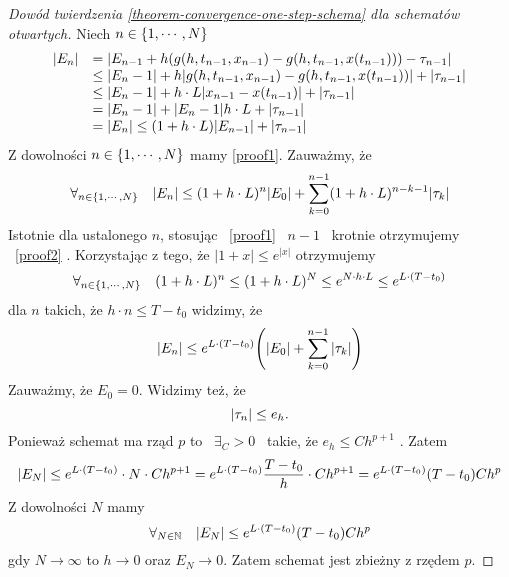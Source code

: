 \documentclass[12pt,a4paper]{report}
\begin{document}
\begin{proof}[Dowód twierdzenia \ref{theorem-convergence-one-step-schema} dla schematów otwartych]
Niech $n \in \left\lbrace {1,\cdots,N} \right\rbrace $ 
\begin{equation}
\begin{array}{rl}
{\left| {E_n} \right|} &= {\left| {E_{n-1} + h(g(h,t_{n-1},x_{n-1}) - g(h,t_{n-1},x(t_{n-1}))) - \tau_{n-1}} \right|} \\
&\leq {\left| {E_n-1} \right|} + h {\left| {g(h,t_{n-1},x_{n-1}) - g(h,t_{n-1},x(t_{n-1}))} \right|} + {\left| { \tau_{n-1}} \right|}\\
&\leq {\left| {E_n-1} \right|} + h \cdot L {\left| {x_{n-1} - x(t_{n-1})} \right|} + {\left| { \tau_{n-1}} \right|}\\
&= {\left| {E_n-1} \right|} + {\left| {E_n-1} \right|} h \cdot L + {\left| { \tau_{n-1}} \right|}\\
&= {\left| {E_n} \right|} \leq (1 + h \cdot L) {\left| {E_{n-1}} \right|} + {\left| {\tau_{n-1}} \right|} 
\end{array}
\end{equation}
Z dowolności $n \in \left\lbrace {1, \cdots, N} \right\rbrace$ mamy \ref{proof1}. 
Zauważmy, że 
\begin{equation} \label{proof2}
\forall_{n \in \set{1,\cdots,N}} \quad \abs{E_n} \leq (1 + h \cdot L)^{n} \abs{E_0} + \sum_{k=0}^{n-1} (1+ h \cdot L)^{n-k-1} \abs{\tau_k} 
\end{equation}
Istotnie dla ustalonego $n$, stosując \  \ref{proof1} \  $n-1$ \  krotnie otrzymujemy \ \ref{proof2} . Korzystając z tego, że $|1+x|\leqslant e^{|x|}$ otrzymujemy
$$
\forall_{n \in \left\lbrace {1,\cdots,N} \right\rbrace} \quad (1 + h \cdot L)^{n} \leq (1 + h \cdot L)^{N} \leq e^{N \cdot h \cdot L} \leq e^{L \cdot (T-t_0)} 
$$
dla $n$ takich, że $h\cdot n\leq  T - t_0 $ widzimy, że
$$
\abs{E_n} \leq e^{L \cdot (T-t_0)} \bracket{\abs{E_0} + \sum_{k=0}^{n-1}\abs{\tau_k}}
$$
Zauważmy, że $E_0 = 0$. Widzimy też, że 
$$
{\left| {\tau_n} \right|} \leq e_h.
$$
Ponieważ schemat ma rząd $p$ to \ $\exists_C>0$ \ takie, że $e_h \leq Ch^{p+1} $ . Zatem
$$
{\left| {E_N} \right|} \leq  e^{L \cdot (T-t_0)} \cdot N \cdot Ch^{p+1}
= e^{L \cdot (T-t_0)} \frac{T-t_0}{h} \cdot Ch^{p+1}
= e^{L \cdot (T-t_0)} (T-t_0) Ch^p
$$
Z dowolności $N$ mamy
$$
\forall_{N \in \mathbb{N}} \quad {\left| {E_N} \right|} \leq e^{L \cdot (T-t_0)} (T-t_0) Ch^p
$$
gdy $ N \to \infty $ to $ h \to 0 $ oraz $ E_N \to 0$. Zatem schemat jest zbieżny z rzędem $p$.
\end{proof}
\end{document}
